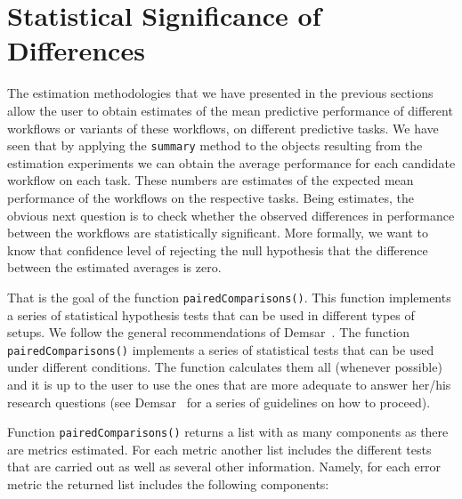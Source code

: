 \documentclass[10pt,a4paper]{article}\usepackage[]{graphicx}\usepackage[]{color}
\begin{document}
\section{Statistical Significance of Differences}

The estimation methodologies that we have presented in the previous
sections allow the user to obtain estimates of the mean predictive
performance of different workflows or variants of these workflows, on
different predictive tasks. We have seen that by applying the
\texttt{summary} method to the objects resulting from the estimation experiments
we can obtain the average performance for each candidate workflow on
each task. These numbers are estimates of the expected mean
performance of the workflows on the respective tasks. Being estimates,
the obvious next question is to check whether the observed differences
in performance between the workflows are statistically
significant. More formally, we want to know that confidence level of rejecting the null hypothesis that the difference between the estimated averages is zero.

That is the goal of the function
\texttt{pairedComparisons()}. This function implements a series of statistical hypothesis tests that can be used in different types of setups. We follow the general recommendations of Demsar~\cite{Dem06}. The function \texttt{pairedComparisons()} implements a series of statistical tests that can be used under different conditions. The function calculates them all (whenever possible) and it is up to the user to use the ones that are more adequate to answer her/his research questions (see Demsar~\cite{Dem06} for a series of guidelines on how to proceed).

Function \texttt{pairedComparisons()} returns a list with as many components as there are metrics estimated. For each metric another list includes the different tests that are carried out as well as several other information. Namely, for each error metric the returned list includes the following components:
\end{document}
